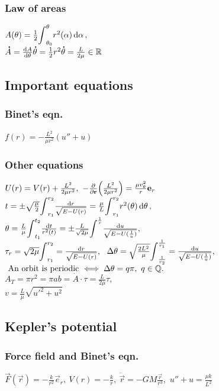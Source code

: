 \subsubsection*{Law of areas}
 $A(\theta)=\frac{1}{2}\scaleint{5ex}^{\theta}_{\theta_{0}} r^{2}(\alpha) \dd{\alpha},\ $\\
 $\accentset{\mbox{\bfseries .}}{A}=\frac{\dd{A}}{\dd{\theta}}\accentset{\mbox{\bfseries .}}{\theta}=\frac{1}{2}r^{2}\accentset{\mbox{\bfseries .}}{\theta}=\frac{L}{2\mu}\in \mathbb{R}$


\subsection{Important equations}
\subsubsection*{Binet's eqn.}
$f(r)=-\frac{L^{2}}{\mu r^{2}}(u''+u)$




\subsubsection*{Other equations}
$U(r)=V(r)+\frac{L^{2}}{2\mu r^{2}},\ -\partials{}{\vec{r}}\Big(\frac{L^{2}}{2\mu r^{2}}\Big)=\frac{\mu v_{\theta}^{2}}{r}\vec{e}_{r}$\\
$t=\pm \sqrt{\frac{\mu}{2}}\scaleint{5ex}_{r_{1}}^{r_{2}}\frac{\dd{r}}{\sqrt{E-U(r)}}=\frac{\mu}{L}\scaleint{5ex}_{r_{1}}^{r_{2}}r^{2}(\theta)\dd{\theta},$\\
$\theta=\frac{L}{\mu}\scaleint{5ex}_{t_{1}}^{t_{2}}\frac{\dd{t}}{r^{2}(t)}=\pm\frac{L}{\sqrt{2\mu}}\scaleint{5ex}^{\frac{1}{r}}\frac{\dd{u}}{\sqrt{E-U(\frac{1}{u})}},$\\
$\tau_{r}=\sqrt{2\mu}\scaleint{5ex}_{r_{1}}^{r_{2}}=\frac{\dd{r}}{\sqrt{E-U(r)}},\ $
$\Delta{\theta}=\sqrt{\frac{2L^{2}}{\mu}}\scaleint{5ex}_{\frac{1}{r_{2}}}^{\frac{1}{r_{1}}}=\frac{\dd{u}}{\sqrt{E-U(\frac{1}{u})}},$\\
$\text{ An orbit is periodic $\iff \Delta\theta=q\pi,\ q\in\mathbb{Q}$}.$\\
$A_{T}=\pi r^{2}=\pi ab=\dot{A}\cdot\tau=\frac{L}{2\mu}\tau,$\\
$v=\frac{L}{\mu}\sqrt{u'^{2}+u^{2}}$


\subsection{Kepler's potential}



\subsubsection*{Force field and Binet's eqn.}
$\vec{F}(\vec{r})=-\frac{k}{r^{2}}\vec{e}_{r},\ V(r)=-\frac{k}{r},\ \ddot{\vec{r}}=-GM\frac{\vec{r}}{r^3}$,\ 
$u''+u=\frac{\mu k}{L^{2}}$



